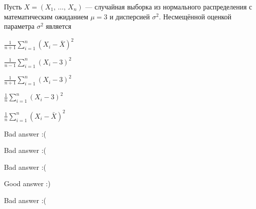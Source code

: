 
\begin{question}
Пусть \(X = (X_1, \, \ldots, \, X_n)\) — случайная выборка из
нормального распределения с математическим ожиданием \(\mu = 3\) и
дисперсией \(\sigma^2\). Несмещённой оценкой параметра \(\sigma^2\)
является
\begin{answerlist}
  \item \(\frac{1}{n+1} \sum_{i=1}^{n}(X_i - \bar{X})^2\)
  \item \(\frac{1}{n-1} \sum_{i=1}^{n}(X_i - 3)^2\)
  \item \(\frac{1}{n+1} \sum_{i=1}^{n}(X_i - 3)^2\)
  \item \(\frac{1}{n} \sum_{i=1}^{n}(X_i - 3)^2\)
  \item \(\frac{1}{n} \sum_{i=1}^{n}(X_i - \bar{X})^2\)
\end{answerlist}
\end{question}

\begin{solution}
\begin{answerlist}
  \item Bad answer :(
  \item Bad answer :(
  \item Bad answer :(
  \item Good answer :)
  \item Bad answer :(
\end{answerlist}
\end{solution}

